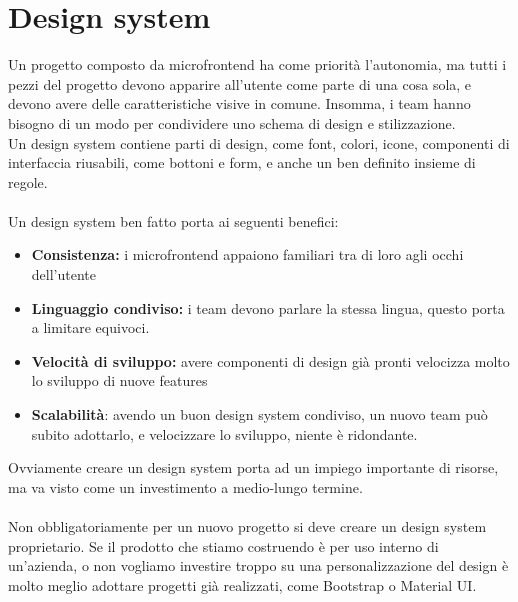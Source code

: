  \section{Design system}
 Un progetto composto da microfrontend ha come priorità l’autonomia, ma tutti i pezzi del progetto devono apparire 
 all’utente come parte di una cosa sola, e devono avere delle caratteristiche visive in comune. Insomma, i team hanno 
 bisogno di un modo per condividere uno schema di design e stilizzazione.
\\
Un design system contiene parti di design, come font, colori, icone, componenti di interfaccia riusabili, come bottoni 
e form, e anche un ben definito insieme di regole.
\\\\
Un design system ben fatto porta ai seguenti benefici:
\begin{itemize}
    \item \textbf{Consistenza:} i microfrontend appaiono familiari tra di loro agli occhi dell’utente
    \item \textbf{Linguaggio condiviso:} i team devono parlare la stessa lingua, questo porta a limitare equivoci.
    \item \textbf{Velocità di sviluppo:} avere componenti di design già pronti velocizza molto lo sviluppo di nuove features
    \item \textbf{Scalabilità}: avendo un buon design system condiviso, un nuovo team può subito adottarlo, e velocizzare lo sviluppo, niente è ridondante.
\end{itemize}
Ovviamente creare un design system porta ad un impiego importante di risorse, ma va visto come un investimento a medio-lungo termine.
\\\\
Non obbligatoriamente per un nuovo progetto si deve creare un design system proprietario.
Se il prodotto che stiamo costruendo è per uso interno di un’azienda, o non vogliamo investire troppo su una personalizzazione del design è molto meglio adottare progetti
 già realizzati, come Bootstrap o Material UI.
